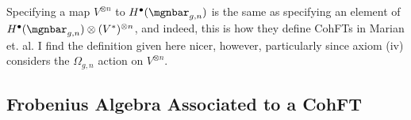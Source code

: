 \documentclass[raggedright, nofonts, notitlepage, openany, debug]{tufte-book}
\begin{document}
\begin{rmk}
  Specifying a map $V^{\otimes n}$ to $H^\bullet(\mgnbar_{g,n})$ is the same as specifying an element of $H^\bullet(\mgnbar_{g,n})\otimes (V^{*})^{\otimes n}$, and indeed, this is how they define CohFTs in Marian et. al. I find the definition given here nicer, however, particularly since axiom (iv) considers the $\Omega_{g,n}$ action on $V^{\otimes n}$.
\end{rmk}

\subsection{Frobenius Algebra Associated to a CohFT}



\newpage

\end{document}
